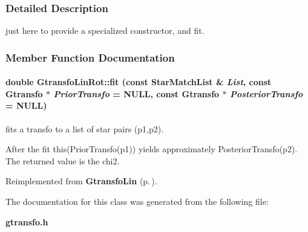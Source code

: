 \subsubsection{Detailed Description}
just here to provide a specialized constructor, and fit.



\subsubsection{Member Function Documentation}
\paragraph{\setlength{\rightskip}{0pt plus 5cm}double Gtransfo\-Lin\-Rot::fit (const Star\-Match\-List \& {\em List}, const {\bf Gtransfo} $\ast$ {\em Prior\-Transfo} = NULL, const {\bf Gtransfo} $\ast$ {\em Posterior\-Transfo} = NULL)\hspace{0.3cm}{\tt  [virtual]}}\hfill\label{class_gtransfolinrot_a2}


fits a transfo to a list of star pairs (p1,p2).

After the fit this(Prior\-Transfo(p1)) yields approximately Posterior\-Transfo(p2). The returned value is the chi2. 

Reimplemented from {\bf Gtransfo\-Lin} {\rm (p.\,\pageref{class_gtransfolin_a9})}.

The documentation for this class was generated from the following file:\begin{CompactItemize}
\item 
{\bf gtransfo.h}\end{CompactItemize}
